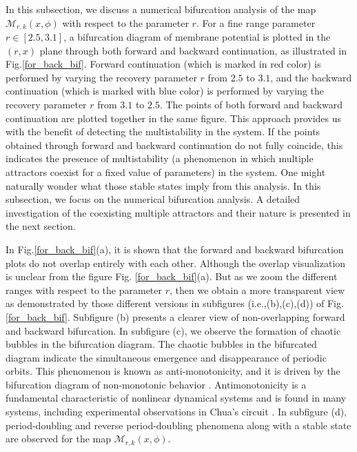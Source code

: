 \documentclass{article}
\begin{document}
In this subsection, we discuss a numerical bifurcation analysis of the map $\mathcal{M}_{r,k}(x,\phi)$ with respect to the parameter $r$. For a fine range parameter $r\in [2.5,3.1]$, a bifurcation diagram of membrane potential is plotted in the $(r,x)$ plane through both forward and backward continuation, as illustrated in Fig.\ref{for_back_bif}. Forward continuation (which is marked in red color) is performed by varying the recovery parameter $r$ from $2.5$ to $3.1$, and the backward continuation (which is marked with blue color) is performed by varying the recovery parameter $r$ from $3.1$ to $2.5$. The points of both forward and backward continuation are plotted together in the same figure. This approach provides us with the benefit of detecting the multistability in the system. If the points obtained through forward and backward continuation do not fully coincide, this indicates the presence of multistability (a phenomenon in which multiple attractors coexist for a fixed value of parameters) in the system. One might naturally wonder what those stable states imply from this analysis. In this subsection, we focus on the numerical bifurcation analysis. A  detailed investigation of the coexisting multiple attractors and their nature is presented in the next section.



In Fig.\ref{for_back_bif}(a), it is shown that the forward and backward bifurcation plots do not overlap entirely with each other. Although the overlap visualization is unclear from the figure Fig. \ref{for_back_bif}(a). But as we zoom the different ranges with respect to the parameter $r$, then we obtain a more transparent view as demonstrated by those different versions in subfigures (i.e.,(b),(c),(d)) of Fig.\ref{for_back_bif}. Subfigure (b) presents a clearer view of non-overlapping forward and backward bifurcation. In subfigure (c), we observe the formation of chaotic bubbles in the bifurcation diagram. The chaotic bubbles in the bifurcated diagram indicate the simultaneous emergence and disappearance of periodic orbits. This phenomenon is known as anti-monotonicity, and it is driven by the bifurcation diagram of non-monotonic behavior \cite{dawson1992antimonotonicity}. Antimonotonicity is a fundamental characteristic of nonlinear dynamical systems and is found in many systems, including experimental observations in Chua's circuit \cite{kocarev1993experimental}. In subfigure (d), period-doubling and reverse period-doubling phenomena along with a stable state are observed for the map $\mathcal{M}_{r,k}(x,\phi)$. 
\end{document}
